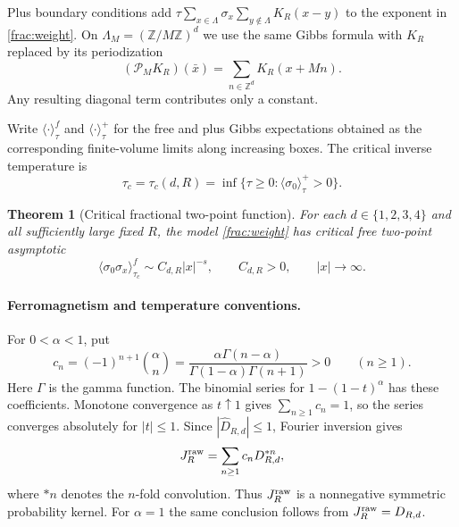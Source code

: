 \documentclass[11pt]{article}
\newtheorem{theorem}{Theorem}
\newcommand{\Z}{\mathbb Z}
\begin{document}
Plus boundary conditions add
\(\tau\sum_{x\in\Lambda}\sigma_x\sum_{y\notin\Lambda} K_R(x-y)\)
to the exponent in \eqref{frac:weight}.
On \(\Lambda_M=(\Z/M\Z)^d\) we use the same Gibbs formula with
\(K_R\) replaced by its periodization
\[
 (\mathcal P_M K_R)(\bar x)=\sum_{n\in\Z^d}K_R(x+Mn).
\]
Any resulting diagonal term contributes only a constant.

Write \(\langle\cdot\rangle_\tau^f\) and
\(\langle\cdot\rangle_\tau^+\) for the free and plus Gibbs
expectations obtained as the corresponding finite-volume limits along
increasing boxes. The critical inverse temperature is
\[
 \tau_c=\tau_c(d,R)=
 \inf\{\tau\ge0:\langle\sigma_0\rangle_\tau^+>0\}.
\]

\begin{theorem}[Critical fractional two-point function]
\label{frac:main}\label{thm:main}
For each \(d\in\{1,2,3,4\}\) and all sufficiently large fixed \(R\),
the model \eqref{frac:weight} has critical free two-point asymptotic
\begin{equation}\label{frac:target}
 \langle\sigma_0\sigma_x\rangle^f_{\tau_c}
       \sim C_{d,R}|x|^{-s},\qquad C_{d,R}>0,
       \qquad |x|\longrightarrow\infty.
\end{equation}
\end{theorem}

\paragraph{Ferromagnetism and temperature conventions.}
For \(0<\alpha<1\), put
\[
 c_n=(-1)^{n+1}\binom\alpha n
 =\frac{\alpha\Gamma(n-\alpha)}
        {\Gamma(1-\alpha)\Gamma(n+1)}>0
 \qquad(n\ge1).
\]
Here \(\Gamma\) is the gamma function. The binomial series for
\(1-(1-t)^\alpha\) has these coefficients.
Monotone convergence as \(t\uparrow1\) gives \(\sum_{n\ge1}c_n=1\),
so the series converges absolutely for \(|t|\le1\). Since
\(|\widehat D_{R,d}|\le1\), Fourier inversion gives
\begin{equation}\label{frac:binomial}
 J_R^{\rm raw}=\sum_{n\ge1}c_nD_{R,d}^{*n},
\end{equation}
where \(*n\) denotes the \(n\)-fold convolution. Thus
\(J_R^{\rm raw}\) is a nonnegative symmetric probability kernel.
For \(\alpha=1\) the same conclusion follows from
\(J_R^{\rm raw}=D_{R,d}\).
\end{document}
